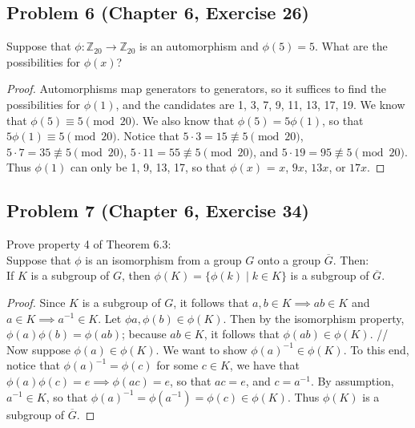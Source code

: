 \documentclass{article}
\begin{document}
\subsection*{Problem 6 (Chapter 6, Exercise 26)}
Suppose that $\phi \colon \mathbb{Z}_{20} \to \mathbb{Z}_{20}$ is an automorphism and $\phi(5) = 5$. What are the possibilities for $\phi(x)$?

\begin{proof}
Automorphisms map generators to generators, so it suffices to find the possibilities for $\phi(1)$, and the candidates are 1, 3, 7, 9, 11, 13, 17, 19. We know that $\phi(5) \equiv 5 \pmod {20}$. We also know that $\phi(5) = 5\phi(1)$, so that $5\phi(1) \equiv 5 \pmod{20}$. Notice that $5 \cdot 3 = 15 \not\equiv 5 \pmod{20}$, $5 \cdot 7 = 35 \not\equiv 5 \pmod{20}$, $5 \cdot 11 = 55 \not\equiv 5 \pmod{20}$, and $5 \cdot 19 = 95 \not\equiv 5 \pmod{20}$. Thus $\phi(1)$ can only be 1, 9, 13, 17, so that $\phi(x)$ = $x$, $9x$, $13x$, or $17x$.

\end{proof}

\subsection*{Problem 7 (Chapter 6, Exercise 34)}

Prove property 4 of Theorem 6.3: \\
Suppose that $\phi$ is an isomorphism from a group $G$ onto a group $\overline{G}$. Then: \\
If $K$ is a subgroup of $G$, then $\phi(K) = \{\phi(k) \mid k \in K\}$ is a subgroup of $\overline{G}$.

\begin{proof}

Since $K$ is a subgroup of $G$, it follows that $a, b \in K \implies ab \in K$ and $a \in K \implies a^{-1} \in K$. Let $\phi{a}, \phi(b) \in \phi(K)$. Then by the isomorphism property, $\phi(a)\phi(b) = \phi(ab)$; because $ab \in K$, it follows that $\phi(ab) \in \phi(K)$. //
Now suppose $\phi(a) \in \phi(K)$. We want to show $\phi(a)^{-1} \in \phi(K)$. To this end, notice that $\phi(a)^{-1} = \phi(c)$ for some $c \in K$, we have that $\phi(a)\phi(c) = e \implies \phi(ac) = e$, so that $ac = e$, and $c = a^{-1}$. By assumption, $a^{-1} \in K$, so that $\phi(a)^{-1} = \phi(a^{-1}) = \phi(c) \in \phi(K)$. Thus $\phi(K)$ is a subgroup of $\overline{G}$.  

\end{proof}
\end{document}
